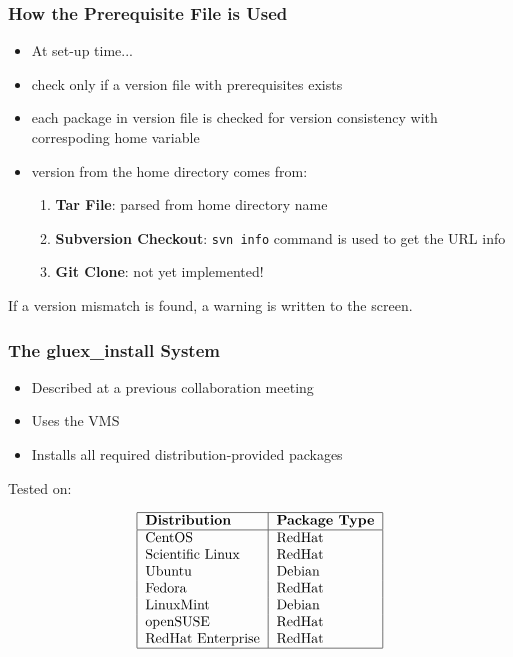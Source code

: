 \documentclass{beamer}
\newcommand{\bi}{\begin{itemize}}
\newcommand{\ei}{\end{itemize}}
\newcommand{\I}{\item}
\begin{document}
\begin{frame}
  \frametitle{How the Prerequisite File is Used}

\bi
\I At set-up time...
  \I check only if a version file with prerequisites exists
  \I each package in version file is checked for version consistency with correspoding home variable
  \I version from the home directory comes from:
\begin{enumerate}
\item {\bf Tar File}: parsed from home directory name
\item {\bf Subversion Checkout}: {\tt svn info} command is used to get the URL info
\item {\bf Git Clone}: not yet implemented!
\end{enumerate}
\ei
If a version mismatch is found, a warning is written to the screen.

\end{frame}

\begin{frame}
  \frametitle{The gluex\_install System}

\begin{itemize}
\item Described at a previous collaboration meeting
\item Uses the VMS
\item Installs all required distribution-provided packages
\end{itemize}

Tested on:

\begin{table}
$$
\begin{tabular}{|l|l|}
\hline
\bf Distribution & \bf Package Type \\
\hline
CentOS & RedHat \\
Scientific Linux & RedHat \\
Ubuntu & Debian \\
Fedora & RedHat \\
LinuxMint & Debian \\
openSUSE & RedHat \\
RedHat Enterprise & RedHat \\
\hline
\end{tabular}
$$
\end{table}

\end{frame}
\end{document}
